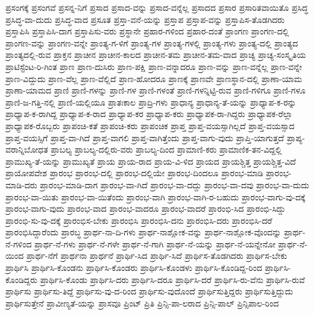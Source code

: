 {ಪ್ರಸಂಗಕ್ಕೆ
ಪ್ರಸಂಗವೆ
ಪ್ರಸನ್ನ-ನಿಗೆ
ಪ್ರಸಾದ
ಪ್ರಸಾದ-ವನ್ನು
ಪ್ರಸಾದ-ವನ್ನೆಲ್ಲ
ಪ್ರಸಾದದ
ಪ್ರಸಾರ
ಪ್ರಸಾರಿತವಾಯಿತೊ
ಪ್ರಸಿದ್ಧ
ಪ್ರಸಿದ್ಧ-ವಾ-ದುದು
ಪ್ರಸಿದ್ಧ-ವಾದ
ಪ್ರಸೂತ
ಪ್ರಸ್ತಾ-ವನೆ-ಯನ್ನು
ಪ್ರಸ್ತಾಪ
ಪ್ರಸ್ತಾಪ-ವನ್ನು
ಪ್ರಸ್ತಾಪಿಸ-ತೊಡಗಿದರು
ಪ್ರಸ್ತಾಪಿಸಿ
ಪ್ರಸ್ತಾಪಿಸಿ-ದಾಗ
ಪ್ರಸ್ತಾಪಿಸು-ವರು
ಪ್ರಸ್ಥಾನೇ
ಪ್ರಹಾರ-ಗಳಿಂದ
ಪ್ರಹಾರ-ದಂತೆ
ಪ್ರಾಂಗಣ
ಪ್ರಾಂಗಣ-ದಲ್ಲಿ
ಪ್ರಾಂಗಣ-ವನ್ನು
ಪ್ರಾಂಗಣ-ವನ್ನೇ
ಪ್ರಾಂತ್ಯ-ಗ-ಳಿಗೆ
ಪ್ರಾಂತ್ಯ-ಗಳ
ಪ್ರಾಂತ್ಯ-ಗಳಲ್ಲಿ
ಪ್ರಾಂತ್ಯ-ಗಳು
ಪ್ರಾಂತ್ಯ-ದಲ್ಲಿ
ಪ್ರಾಂತ್ಯದ
ಪ್ರಾಂತ್ಯದಲ್ಲಿ-ರುವ
ಪ್ರಾಕ್ತನ
ಪ್ರಾಚೀನ
ಪ್ರಾಚೀನ-ಕಾಲದ
ಪ್ರಾಚೀನ-ತಮ
ಪ್ರಾಚೀನ-ತಮ-ವಾದ
ಪ್ರಾಚ್ಯ
ಪ್ರಾಚ್ಯ-ಸಂಸ್ಕೃತಿಯ
ಪ್ರಾಟಿಸ್ಟೆಂಟ-ರಿ-ಗಿಂತ
ಪ್ರಾಣ
ಪ್ರಾಣ-ದುಸಿರು
ಪ್ರಾಣ-ಪಕ್ಷಿ
ಪ್ರಾಣ-ವನ್ನಾದರೂ
ಪ್ರಾಣ-ವನ್ನು
ಪ್ರಾಣ-ವನ್ನೆಲ್ಲ
ಪ್ರಾಣ-ವನ್ನೇ
ಪ್ರಾಣ-ವಿದ್ದುದು
ಪ್ರಾಣ-ವೆಲ್ಲ
ಪ್ರಾಣ-ವೆಲ್ಲಿದೆ
ಪ್ರಾಣ-ಹೋದರೂ
ಪ್ರಾಣಕ್ಕೆ
ಪ್ರಾಣವೇ
ಪ್ರಾಣಸ್ಥಾನ-ದಲ್ಲಿ
ಪ್ರಾಣಾ-ಯಾಮ
ಪ್ರಾಣಾ-ಯಾಮದ
ಪ್ರಾಣಿ
ಪ್ರಾಣಿ-ಗಳನ್ನು
ಪ್ರಾಣಿ-ಗಳ
ಪ್ರಾಣಿ-ಗಳಂತೆ
ಪ್ರಾಣಿ-ಗಳನ್ನಿಟ್ಟಿ-ರುವ
ಪ್ರಾಣಿ-ಗಳಿಗೂ
ಪ್ರಾಣಿ-ಗಳೂ
ಪ್ರಾಣಿ-ಜ-ಗತ್ತಿ-ನಲ್ಲಿ
ಪ್ರಾಣಿ-ಯಲ್ಲಿಯೂ
ಪ್ರಾತಃಕಾಲ
ಪ್ರಾದ್ರಿ-ಗಳು
ಪ್ರಾಧಾನ್ಯ
ಪ್ರಾಧಾನ್ಯ-ತೆ-ಯನ್ನು
ಪ್ರಾಧ್ಯಾಪ-ಕ-ರನ್ನು
ಪ್ರಾಧ್ಯಾಪ-ಕ-ರಾಗಿದ್ದ
ಪ್ರಾಧ್ಯಾಪ-ಕ-ರಾದ
ಪ್ರಾಧ್ಯಾಪ-ಕರ
ಪ್ರಾಧ್ಯಾಪ-ಕರು
ಪ್ರಾಧ್ಯಾಪಕ-ರಾ-ಗಿದ್ದರು
ಪ್ರಾಧ್ಯಾಪಕ-ರೆಲ್ಲಾ
ಪ್ರಾಧ್ಯಾಪಕ-ರೊಬ್ಬರು
ಪ್ರಾಪಂಚಿ-ಕತೆ
ಪ್ರಾಪಂಚಿ-ಕರು
ಪ್ರಾಪಂಚಿಕ
ಪ್ರಾಪ್ತ
ಪ್ರಾಪ್ತ-ವಯಸ್ಸಾಗಿಲ್ಲದೆ
ಪ್ರಾಪ್ತ-ವಯಸ್ಸಾದ
ಪ್ರಾಪ್ತ-ವಯಸ್ಸಿಗೆ
ಪ್ರಾಪ್ತ-ವಾ-ಗಿದೆ
ಪ್ರಾಪ್ತ-ವಾಗಲಿ
ಪ್ರಾಪ್ತ-ವಾಗಿತ್ತೆಂದು
ಪ್ರಾಪ್ತ-ವಾಗು-ವುದು
ಪ್ರಾಪ್ತಿ-ಯಾಗುತ್ತದೆ
ಪ್ರಾಪ್ಯ-ವರಾನ್ನಿಬೋಧತ
ಪ್ರಾಬಲ್ಯ
ಪ್ರಾಬಲ್ಯ-ದಲ್ಲಿರು-ವರು
ಪ್ರಾಬಲ್ಯ-ದಿಂದ
ಪ್ರಾಮಾಣಿ-ಕರು
ಪ್ರಾಮಾಣಿಕ-ತನ-ವಿದ್ದಲ್ಲಿ
ಪ್ರಾಮುಖ್ಯ-ತೆ-ಯನ್ನು
ಪ್ರಾಮುಖ್ಯತೆ
ಪ್ರಾಯ
ಪ್ರಾಯ-ರಾದ
ಪ್ರಾಯ-ವಿ-ಳಿದ
ಪ್ರಾಯದ
ಪ್ರಾಯಶ್ಚಿತ್ತ
ಪ್ರಾಯಶ್ಚಿತ್ತ-ವಿದೆ
ಪ್ರಾಯೋಪವೇಶ
ಪ್ರಾರಂಭ
ಪ್ರಾರಂಭ-ದಲ್ಲಿ
ಪ್ರಾರಂಭ-ದಲ್ಲಿಯೇ
ಪ್ರಾರಂಭ-ದಿಂದಲೂ
ಪ್ರಾರಂಭ-ಮಾಡಿ
ಪ್ರಾರಂಭ-ಮಾಡಿ-ದರು
ಪ್ರಾರಂಭ-ಮಾಡಿ-ದಾಗ
ಪ್ರಾರಂಭ-ವಾ-ಗಿದೆ
ಪ್ರಾರಂಭ-ವಾ-ದದ್ದು
ಪ್ರಾರಂಭ-ವಾ-ದವು
ಪ್ರಾರಂಭ-ವಾ-ದುದು
ಪ್ರಾರಂಭ-ವಾ-ಯಿತು
ಪ್ರಾರಂಭ-ವಾ-ಯಿತೆಂದು
ಪ್ರಾರಂಭ-ವಾಗಿ
ಪ್ರಾರಂಭ-ವಾಗಿ-ರ-ಬಹುದು
ಪ್ರಾರಂಭ-ವಾಗು-ವು-ದಕ್ಕೆ
ಪ್ರಾರಂಭ-ವಾಗು-ವುದು
ಪ್ರಾರಂಭ-ವಾದ
ಪ್ರಾರಂಭ-ವಾದರೂ
ಪ್ರಾರಂಭ-ವಾದರೆ
ಪ್ರಾರಂಭಿ-ಸಿದ
ಪ್ರಾರಂಭಿ-ಸಿದ್ದು
ಪ್ರಾರಂಭಿ-ಸು-ವು-ದಕ್ಕೆ
ಪ್ರಾರಂಭಿಸ-ಬೇಕು
ಪ್ರಾರಂಭಿಸಿ
ಪ್ರಾರಂಭಿಸಿ-ದನು
ಪ್ರಾರಂಭಿಸಿ-ದರು
ಪ್ರಾರಂಭಿಸಿ-ದರೆ
ಪ್ರಾರಂಭಿಸಿದ್ದಾರೆಂದು
ಪ್ರಾರಬ್ಧ
ಪ್ರಾರ್ಥ-ನಾ-ದಿ-ಗಳು
ಪ್ರಾರ್ಥ-ನಾಶ್ಲೋಕ-ವನ್ನು
ಪ್ರಾರ್ಥ-ನಾಶ್ಲೋಕ-ವೊಂದನ್ನು
ಪ್ರಾರ್ಥ-ನೆ-ಗಳಿಂದ
ಪ್ರಾರ್ಥ-ನೆ-ಗಳು
ಪ್ರಾರ್ಥ-ನೆ-ಗಳೇ
ಪ್ರಾರ್ಥ-ನೆ-ಗಾಗಿ
ಪ್ರಾರ್ಥ-ನೆ-ಯನ್ನು
ಪ್ರಾರ್ಥ-ನೆ-ಯನ್ನೇನೋ
ಪ್ರಾರ್ಥ-ನೆ-ಯಿಂದ
ಪ್ರಾರ್ಥ-ನೆಗೆ
ಪ್ರಾರ್ಥನಾ
ಪ್ರಾರ್ಥನೆ
ಪ್ರಾರ್ಥಿ-ಸಿದ
ಪ್ರಾರ್ಥಿ-ಸಿದೆ
ಪ್ರಾರ್ಥಿಸ-ತೊಡಗಿದರು
ಪ್ರಾರ್ಥಿಸ-ಬೇಕು
ಪ್ರಾರ್ಥಿಸಿ
ಪ್ರಾರ್ಥಿಸಿ-ಕೊಂಡನು
ಪ್ರಾರ್ಥಿಸಿ-ಕೊಂಡರು
ಪ್ರಾರ್ಥಿಸಿ-ಕೊಂಡಳು
ಪ್ರಾರ್ಥಿಸಿ-ಕೊಂಡಿದ್ದ-ರಿಂದ
ಪ್ರಾರ್ಥಿಸಿ-ಕೊಂಡಿದ್ದರು
ಪ್ರಾರ್ಥಿಸಿ-ಕೊಂಡು
ಪ್ರಾರ್ಥಿಸಿ-ದರು
ಪ್ರಾರ್ಥಿಸಿ-ದರೂ
ಪ್ರಾರ್ಥಿಸಿ-ದರೆ
ಪ್ರಾರ್ಥಿಸಿ-ರು-ವೆನು
ಪ್ರಾರ್ಥಿಸಿ-ರುವೆ
ಪ್ರಾರ್ಥಿಸು
ಪ್ರಾರ್ಥಿಸು-ತಿದ್ದೆ
ಪ್ರಾರ್ಥಿಸು-ವು-ದ-ರಿಂದ
ಪ್ರಾರ್ಥಿಸು-ವುದೊಂದೆ
ಪ್ರಾರ್ಥಿಸುತ್ತಿದ್ದರು
ಪ್ರಾರ್ಥಿಸುತ್ತಿದ್ದುದು
ಪ್ರಾರ್ಥಿಸುತ್ತೇನೆ
ಪ್ರಾವೀಣ್ಯತೆ-ಯನ್ನು
ಪ್ರಾಸವೂ
ಪ್ರಿಂಟ್
ಪ್ರಿತಿ
ಪ್ರಿನ್ಸಿ-ಪಾ-ಲರಾದ
ಪ್ರಿನ್ಸಿ-ಪಾಲ್
ಪ್ರಿನ್ಸಿಪಾಲ-ರಿಂದ
}
